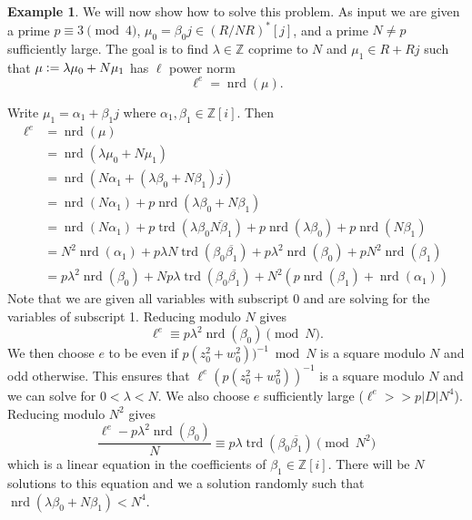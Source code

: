 \documentclass[10pt]{article}
\theoremstyle{plain}
\theoremstyle{definition}
\newtheorem{example}[theorem]{Example}
\newcommand{\op}{\operatorname}
\newcommand{\Z}{\mathbb{Z}}
\newcommand{\nrd}{\op{nrd}}
\newcommand{\trd}{\op{trd}}
\begin{document}
\begin{example}
    We will now show how to solve this problem.
    As input we are given a prime \( p \equiv 3 \pmod{4} \), \( \mu_0 = \beta_0j \in (R / NR)^*[j] \), and a prime \( N \neq p \) sufficiently large.
    The goal is to find \( \lambda \in \Z \) coprime to \( N \) and \( \mu_1 \in  R + Rj \) such that \( \mu \vcentcolon = \lambda \mu_0 + N \mu_1 \) has \( \ell \) power norm
    \[
        \ell^e = \nrd(\mu).
    \]

    Write \( \mu_1 = \alpha_1 + \beta_1j \) where \( \alpha_1, \beta_1 \in \Z[i] \).
    Then
    \begin{align*}
        \ell^e
          & = \nrd(\mu)                                                                                                      \\
          & = \nrd(\lambda \mu_0 + N \mu_1)                                                                                  \\
          & = \nrd(N\alpha_1 + (\lambda\beta_0 + N\beta_1)j)                                                                 \\
          & = \nrd(N\alpha_1) +p\nrd(\lambda\beta_0 + N\beta_1)                                                              \\
          & = \nrd(N\alpha_1) + p\trd(\lambda \beta_0\overline{N\beta_1}) + p\nrd(\lambda\beta_0) + p\nrd(N\beta_1)          \\
          & = N^2\nrd(\alpha_1) +  p\lambda N \trd(\beta_0\overline{\beta_1}) + p\lambda^2 \nrd(\beta_0) + pN^2\nrd(\beta_1) \\
          & = p\lambda^2 \nrd(\beta_0) + Np\lambda \trd(\beta_0\overline{\beta_1}) + N^2(p\nrd(\beta_1) + \nrd(\alpha_1))
    \end{align*}
    Note that we are given all variables with subscript 0 and are solving for the variables of subscript 1.
    Reducing modulo \( N \) gives
    \[
        \ell^e \equiv p\lambda^2\nrd(\beta_0) \pmod{N}.
    \]
    We then choose \( e \) to be even if \( p(z_0^2 + w_0^2))^{-1} \bmod{N} \) is a square modulo \( N \) and odd otherwise.
    This ensures that \( \ell^e(p(z_0^2 + w_0^2))^{-1} \) is a square modulo \( N \) and we can solve for \( 0 <  \lambda < N\).
    We also choose \( e \) sufficiently large (\( \ell^e >> p|D|N^4 \)).
    Reducing modulo \( N^2 \) gives
    \[
        \frac{\ell^e - p\lambda^2\nrd(\beta_0)}{N}\equiv p\lambda \trd(\beta_0\overline{\beta_1}) \pmod{N^2}
    \]
    which is a linear equation in the coefficients of \( \beta_1 \in \Z[i]\).
    There will be \( N \) solutions to this equation and we a solution randomly such that \( \nrd(\lambda\beta_0 + N\beta_1) < N^4 \).


\end{example}
\end{document}
